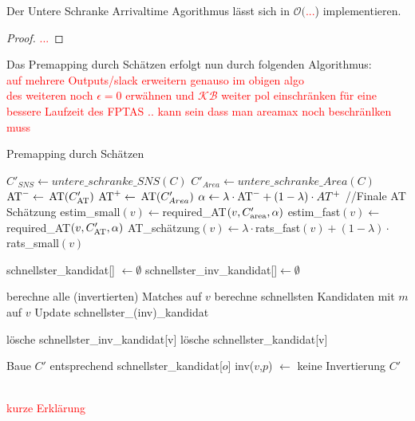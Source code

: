 \documentclass[11pt, a4paper, german]{article}
\begin{document}
\begin{cor}
Der Untere Schranke Arrivaltime Agorithmus lässt sich in $\mathcal{O}($\textcolor{red}{...}) implementieren.
\end{cor}
 \begin{proof}
 \textcolor{red}{...}
 \end{proof}
 Das Premapping durch Schätzen erfolgt nun durch folgenden Algorithmus:\\
\textcolor{red}{\large auf mehrere Outputs/slack erweitern genauso im obigen algo \\
des weiteren noch $\epsilon = 0$ erwähnen und $\mathcal{KB}$ weiter pol einschränken für eine bessere Laufzeit des FPTAS .. kann sein dass man areamax noch beschränlken muss} 
 
\begin{algorithm}[H]
 \LinesNumbered
 \DontPrintSemicolon
 \caption{Premapping durch Schätzen}
 $C'_{SNS} \gets untere\_schranke\_SNS(C)$\;
$C'_{Area} \gets untere\_schranke\_Area(C)$\; 
 $\text{AT}^- \gets $ $\text{AT}(C_{\text{AT}}')$\;
 $\text{AT}^+ \gets $ $\text{AT}(C_{Area}')$\;
 $\alpha \gets \lambda \cdot \text{AT}^- + (1-\lambda)\cdot AT^+$ //Finale AT Sch\"atzung \;
 {
  estim\_small$(v) \gets $required\_AT$(v,C_{\text{area}}',\alpha)$\;
  estim\_fast$(v) \gets $required\_AT$(v,C_{\text{AT}}',\alpha)$\;
  AT\_sch\"atzung$(v) \gets \lambda \cdot $rats\_fast$(v) + (1-\lambda)\cdot$rats\_small$(v)$\;
 }
 
 
 schnellster\_kandidat[] $\gets \emptyset$\;
 schnellster\_inv\_kandidat[]$ \gets \emptyset$\;
 {
   berechne alle (invertierten) Matches auf $v$\;
   {
      berechne schnellsten Kandidaten mit $m$ auf $v$\;
      Update schnellster\_(inv)\_kandidat\;
   }
   {
      
      {
	l\"osche schnellster\_inv\_kandidat[v]\;
      }
      \Else
      {
	l\"osche schnellster\_kandidat[v]\;
      }
   }
 }
 Baue $C'$ entsprechend schnellster\_kandidat[$o$]\;
 {
    {
      {
	inv($v$,$p$) $\gets$ keine Invertierung\;
      }
    }
 }
 \Return $C'$\;
\end{algorithm}\ \\
 
 \textcolor{red}{kurze Erklärung}\\
 
\end{document}
